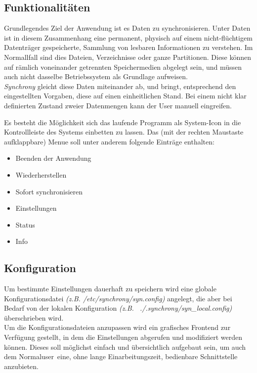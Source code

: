 \documentclass[12pt,oneside,a4paper,bibtotoc,liststotoc,pointlessnumbers]{scrartcl}
\begin{document}
\subsection{Funktionalitäten}
Grundlegendes Ziel der Anwendung ist es Daten zu synchronisieren. Unter Daten ist
in diesem Zusammenhang eine permanent, physisch auf einem nicht-fl\"{u}chtigem Datentr\"{a}ger
gespeicherte, Sammlung von lesbaren Informationen zu verstehen. Im Normallfall sind
dies Dateien, Verzeichnisse oder ganze Partitionen. Diese k\"{o}nnen auf r\"{a}mlich
voneinander getrennten Speichermedien abgelegt sein, und m\"{u}ssen auch nicht
dasselbe Betriebssystem als Grundlage aufweisen.\\
\emph{Synchrony} gleicht diese Daten miteinander ab, und bringt, entsprechend den
eingestellten Vorgaben, diese auf einen einheitlichen Stand. Bei einem nicht
klar definierten Zustand zweier Datenmengen kann der User manuell eingreifen.

Es besteht die M\"{o}glichkeit sich das laufende Programm als System-Icon in die
Kontrollleiste des Systems einbetten zu lassen. Das (mit der rechten Maustaste
aufklappbare) Menue soll unter anderem folgende Eintr\"{a}ge enthalten:
\begin{itemize}
 \item Beenden der Anwendung
\item Wiederherstellen
\item Sofort synchronisieren
\item Einstellungen
\item Status
\item Info
\end{itemize}

\subsection{Konfiguration}
Um bestimmte Einstellungen dauerhaft zu speichern wird eine globale
Konfigurationsdatei \emph{(z.B. /etc/synchrony/syn.config)} angelegt, die aber bei
Bedarf von der lokalen Konfiguration \emph{(z.B. ~./.synchrony/syn\_local.config)}
\"{u}berschrieben wird.\\
Um die Konfigurationsdateien anzupassen wird ein grafisches Frontend zur Verf\"{u}gung
gestellt, in dem die Einstellungen abgerufen und modifiziert werden k\"{o}nnen. Dieses
soll m\"{o}glichst einfach und \"{u}bersichtlich aufgebaut sein, um auch dem
\glqq Normaluser\grqq\ eine, ohne lange Einarbeitungszeit, bedienbare Schnittstelle anzubieten.
\end{document}
